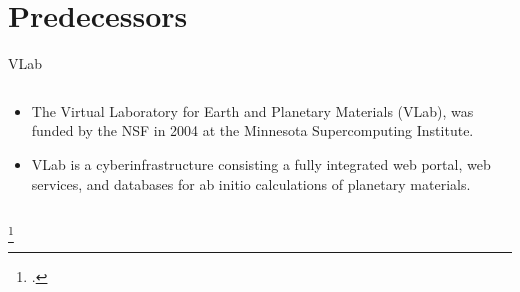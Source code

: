 \section{Predecessors}

\begin{frame}{VLab}
    \begin{columns}[t]
        \begin{column}{0.4\textwidth}
            \begin{itemize}
                \item The Virtual Laboratory for Earth and Planetary Materials (VLab), was
                      funded by the NSF in 2004 at the Minnesota Supercomputing Institute.
                \item VLab is a cyberinfrastructure consisting a fully integrated web
                      portal, web services, and databases for ab initio calculations of
                      planetary materials.
            \end{itemize}
        \end{column}

        \begin{column}{0.6\textwidth}
        \end{column}
    \end{columns}
    \footcitetext{DASILVA2007321}

\end{frame}
